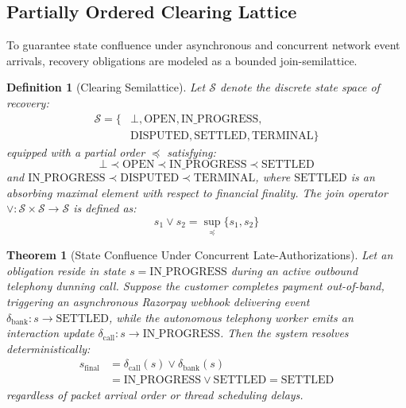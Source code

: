 \documentclass[10pt, twocolumn, a4paper]{article}
\newtheorem{theorem}{Theorem}
\newtheorem{definition}{Definition}
\begin{document}
\subsection{Partially Ordered Clearing Lattice}

To guarantee state confluence under asynchronous and concurrent network event arrivals, recovery obligations are modeled as a bounded join-semilattice.

\begin{definition}[Clearing Semilattice]
Let $\mathcal{S}$ denote the discrete state space of recovery:
\begin{align}
  \mathcal{S} = \{ & \bot, \text{OPEN}, \text{IN\_PROGRESS}, \nonumber \\
  & \text{DISPUTED}, \text{SETTLED}, \text{TERMINAL} \}
\end{align}
equipped with a partial order $\preceq$ satisfying:
\begin{equation}
  \bot \prec \text{OPEN} \prec \text{IN\_PROGRESS} \prec \text{SETTLED}
\end{equation}
and $\text{IN\_PROGRESS} \prec \text{DISPUTED} \prec \text{TERMINAL}$, where $\text{SETTLED}$ is an absorbing maximal element with respect to financial finality.
The join operator $\vee: \mathcal{S} \times \mathcal{S} \to \mathcal{S}$ is defined as:
\begin{equation}
  s_1 \vee s_2 = \sup_{\preceq}\{s_1, s_2\}
\end{equation}
\end{definition}

\begin{theorem}[State Confluence Under Concurrent Late-Authorizations]
\label{thm:confluence}
Let an obligation reside in state $s = \text{IN\_PROGRESS}$ during an active outbound telephony dunning call. Suppose the customer completes payment out-of-band, triggering an asynchronous Razorpay webhook delivering event $\delta_{\text{bank}}: s \to \text{SETTLED}$, while the autonomous telephony worker emits an interaction update $\delta_{\text{call}}: s \to \text{IN\_PROGRESS}$. Then the system resolves deterministically:
\begin{align}
  s_{\text{final}} &= \delta_{\text{call}}(s) \vee \delta_{\text{bank}}(s) \nonumber \\
  &= \text{IN\_PROGRESS} \vee \text{SETTLED} = \text{SETTLED}
\end{align}
regardless of packet arrival order or thread scheduling delays.
\end{theorem}
\end{document}
